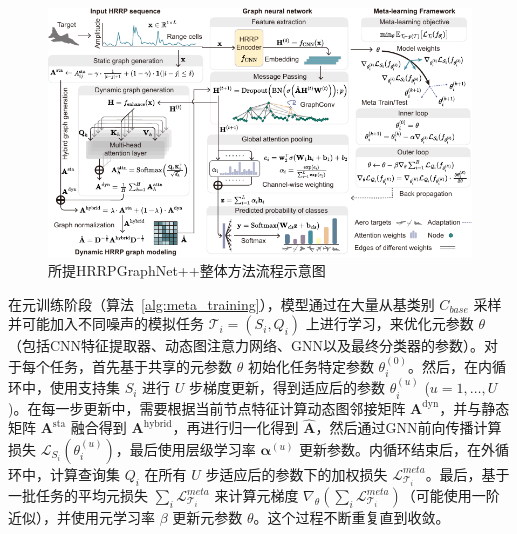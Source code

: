 \begin{figure}[h]
    \centering
    \includegraphics[width=\linewidth]{figures/method1.pdf} %
    \caption{所提HRRPGraphNet++整体方法流程示意图}
    \label{fig:dataset_chap3}
\end{figure}

在元训练阶段（算法~\ref{alg:meta_training}），模型通过在大量从基类别 $C_{base}$ 采样并可能加入不同噪声的模拟任务 $\mathcal{T}_i=(S_i, Q_i)$ 上进行学习，来优化元参数 $\theta$（包括CNN特征提取器、动态图注意力网络、GNN以及最终分类器的参数）。对于每个任务，首先基于共享的元参数 $\theta$ 初始化任务特定参数 $\theta_i^{(0)}$。然后，在内循环中，使用支持集 $S_i$ 进行 $U$ 步梯度更新，得到适应后的参数 $\theta_i^{(u)}$ ($u=1, \dots, U$)。在每一步更新中，需要根据当前节点特征计算动态图邻接矩阵 $\mathbf{A}^{\text{dyn}}$，并与静态矩阵 $\mathbf{A}^{\text{sta}}$ 融合得到 $\mathbf{A}^{\text{hybrid}}$，再进行归一化得到 $\hat{\mathbf{A}}$，然后通过GNN前向传播计算损失 $\mathcal{L}_{S_i}(\theta_i^{(u)})$，最后使用层级学习率 $\boldsymbol{\alpha}^{(u)}$ 更新参数。内循环结束后，在外循环中，计算查询集 $Q_i$ 在所有 $U$ 步适应后的参数下的加权损失 $\mathcal{L}_{\mathcal{T}_i}^{meta}$。最后，基于一批任务的平均元损失 $\sum_i \mathcal{L}_{\mathcal{T}_i}^{meta}$ 来计算元梯度 $\nabla_\theta (\sum_i \mathcal{L}_{\mathcal{T}_i}^{meta})$（可能使用一阶近似），并使用元学习率 $\beta$ 更新元参数 $\theta$。这个过程不断重复直到收敛。


